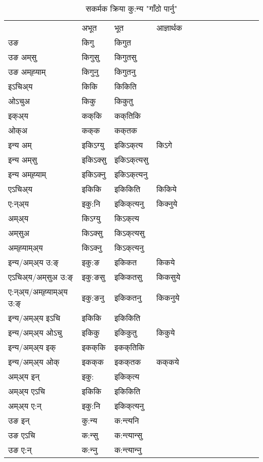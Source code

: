 \begin{table}[H]
\centering
\caption{\label{ik.vt} सकर्मक क्रिया  कु:न्य  "गाँठो पार्नु"  }
\begin{tabular}{l|l|l|l|l|l|l|l|l|l|l|l|l}  \toprule
&अभूत & भूत & आज्ञार्थक \\ 
उङ &किगु &किगुत \\ 
उङ अम्‌सु &किगुसु &किगुतसु \\ 
उङ अम्‌ह्‍याम् &किगुनु &किगुतनु \\ 
इऽचिअ्य &किकि &किकिति   \\ 
ओऽचुअ &किकु &किकुतु   \\ 
इक्अ्य &कक्‌कि &कक्‌तिकि   \\ 
ओक्अ &कक्‌क &कक्‌तक   \\ 
इन्य अम् & इकिऽग्यु  & इकिऽक्‌त्य &किऽगे  \\ 
इन्य अम्‌सु & इकिऽक्सु  & इकिऽक्‌त्यसु   \\ 
इन्य अम्‌ह्‍याम् & इकिऽक्‍नु  & इकिऽक्‌त्यनु   \\ 
एऽचिअ्य & इकिकि & इकिकिति &किकिये    \\ 
ए:न्अ्य & इकु:नि  & इकिक्‌त्यनु &किक्‍नुये  \\ 
अम्अ्य & किऽग्यु  & किऽक्‌त्य  \\ 
अम्‌सुअ & किऽक्सु & किऽक्‌त्यसु  \\ 
अम्‌ह्‍याम्अ्य & किऽक्‍नु  & किऽक्‌त्यनु \\ 
\midrule
इन्य/अम्अ्य उ:ङ्‌&इकु:ङ & इकिकत &किकये \\ 
एऽचिअ्य/अम्‌सुअ उ:ङ्‌ &इकु:ङसु & इकिकतसु &किकसुये \\ 
ए:न्अ्य/अम्‌ह्‍याम्अ्य उ:ङ्‌ &इकु:ङनु & इकिकतनु &किकनुये \\ 
इन्य/अम्अ्य इऽचि & इकिकि & इकिकिति    \\ 
इन्य/अम्अ्य ओऽचु & इकिकु & इकिकुतु  &किकुये  \\ 
इन्य/अम्अ्य इक् & इकक्‌कि & इकक्‌तिकि   \\ 
इन्य/अम्अ्य ओक् & इकक्‌क & इकक्‌तक  &कक्‌कये  \\ 
अम्अ्य इन् & इकु: & इकिक्‌त्य   \\ 
अम्अ्य एऽचि & इकिकि & इकिकिति    \\ 
अम्अ्य ए:न् & इकु:नि  & इकिक्‌त्यनु  \\ 
\midrule
उङ इन् & कु:न्य  & क:न्त्यनि  \\ 
उङ एऽचि & क:न्सु  & क:न्त्यान्सु   \\ 
उङ ए:न्& क:न्‍नु  & क:न्त्यान्‍नु   \\ 
\bottomrule
\end{tabular}
\end{table}


